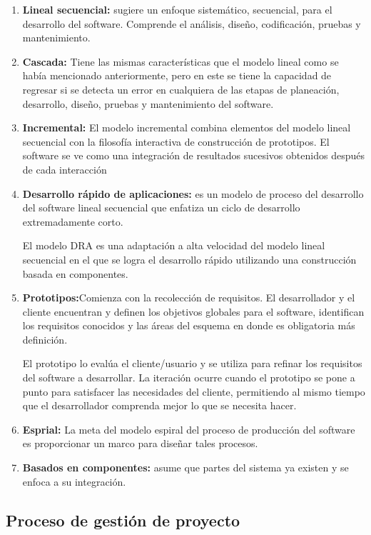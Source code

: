 \documentclass[12pt,twoside]{article}
\begin{document}
\begin{enumerate}
    \item \textbf{Lineal secuencial:} sugiere un enfoque sistemático, secuencial, para el
    desarrollo del software. Comprende el análisis, diseño, codificación, pruebas y mantenimiento.
    \item \textbf{Cascada:} Tiene las mismas características que el modelo lineal como se había 
    mencionado anteriormente, pero en este se tiene la capacidad de regresar si se detecta un error 
    en cualquiera de las etapas de planeación, desarrollo, diseño, pruebas y mantenimiento del 
    software.
    \item \textbf{Incremental:} El modelo incremental combina elementos del modelo lineal 
    secuencial con la filosofía interactiva de construcción de prototipos. El software se ve como 
    una integración de resultados sucesivos obtenidos después de cada interacción
    \item \textbf{Desarrollo rápido de aplicaciones:} es un modelo de proceso del
    desarrollo del software lineal secuencial que enfatiza un ciclo de desarrollo
    extremadamente corto.

    El modelo DRA es una adaptación a alta velocidad del modelo lineal secuencial en el que se 
    logra el desarrollo rápido utilizando una construcción basada en componentes.    
    \item \textbf{Prototipos:}Comienza con la recolección de requisitos. El desarrollador y el 
    cliente encuentran y definen los objetivos globales para el software, identifican los 
    requisitos conocidos y las áreas del esquema en donde es obligatoria más definición.

    El prototipo lo evalúa el cliente/usuario y se utiliza para refinar los requisitos del software 
    a desarrollar. La iteración ocurre cuando el prototipo se pone a punto para satisfacer las 
    necesidades del cliente, permitiendo al mismo tiempo que el desarrollador comprenda mejor lo 
    que se necesita hacer.
    \item \textbf{Esprial:} La meta del modelo espiral del proceso de producción del software es proporcionar un marco para
    diseñar tales procesos.
    \item \textbf{Basados en componentes:} asume que partes del sistema ya existen y se enfoca 
    a su integración.
\end{enumerate}

\subsection{Proceso de gesti\'on de proyecto}
\end{document}
